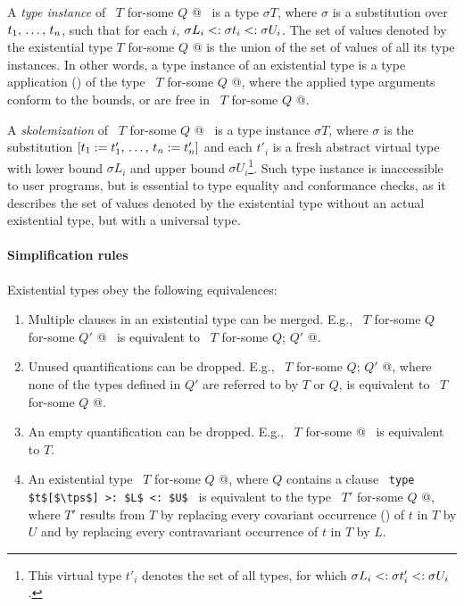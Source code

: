A {\em type instance} of ~\lstinline@$T$ for-some { $Q$ }@~ is a type $\sigma T$, where $\sigma$ is a substitution over $t_1 ,\, \ldots ,\, t_n$, such that for each $i$, $\sigma L_i <: \sigma t_i <: \sigma U_i$. The set of values denoted by the existential type \lstinline@$T$ for-some { $Q$ }@ is the union of the set of values of all its type instances. In other words, a type instance of an existential type is a type application () of the type ~\lstinline@$T$ for-some { $Q$ }@, where the applied type arguments conform to the bounds, or are free in ~\lstinline@$T$ for-some { $Q$ }@. 

A {\em skolemization} of ~\lstinline@$T$ for-some { $Q$ }@~ is a type instance $\sigma T$, where $\sigma$ is the substitution $[t_1 := t'_1 ,\, \ldots ,\, t_n := t'_n]$ and each $t'_i$ is a fresh abstract virtual type with lower bound $\sigma L_i$ and upper bound $\sigma U_i$\footnote{This virtual type $t'_i$ denotes the set of all types, for which $\sigma L_i <: \sigma t'_i <: \sigma U_i$.}. Such type instance is inaccessible to user programs, but is essential to type equality and conformance checks, as it describes the set of values denoted by the existential type without an actual existential type, but with a universal type. 



\paragraph{Simplification rules}
Existential types obey the following equivalences:
\begin{enumerate}
\item
Multiple  clauses in an existential type can be merged. E.g., ~\lstinline@$T$ for-some { $Q$ } for-some { $Q'$ }@~ is equivalent to ~\lstinline@$T$ for-some { $Q$; $Q'$ }@. 

\item
Unused quantifications can be dropped. E.g., ~\lstinline@$T$ for-some { $Q$; $Q'$ }@, where none of the types defined in $Q'$ are referred to by $T$ or $Q$, is equivalent to ~\lstinline@$T$ for-some { $Q$ }@. 

\item
An empty quantification can be dropped. E.g., ~\lstinline@$T$ for-some { }@~ is equivalent to $T$. 

\item
An existential type ~\lstinline@$T$ for-some { $Q$ }@, where $Q$ contains a clause ~\lstinline!type $t$[$\tps$] >: $L$ <: $U$!~ is equivalent to the type ~\lstinline@$T'$ for-some { $Q$ }@, where $T'$ results from $T$ by replacing every covariant occurrence () of $t$ in $T$ by $U$ and by replacing every contravariant occurrence of $t$ in $T$ by $L$. 
\end{enumerate}



